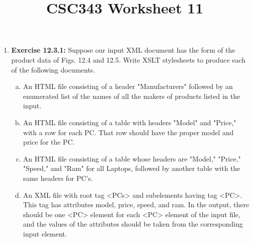 \documentclass[12pt]{article}
\begin{document}
\title{CSC343 Worksheet 11}
\maketitle

\begin{enumerate}[1.]
    \item \textbf{Exercise 12.3.1:} Suppose our input XML document has the form
    of the product data of Figs. 12.4 and 12.5. Write XSLT stylesheets to produce
    each of the following documents.

    \begin{enumerate}[a)]
        \item An HTML file consisting of a header "Manufacturers" followed by an enumerated list of the names of all the makers of products listed in the input.
        \item An HTML file consisting of a table with headers "Model" and "Price," with a row for each PC. That row should have the proper model and price for the PC.
        \item An HTML file consisting of a table whose headers are "Model," "Price," "Speed," and "Ram" for all Laptops, followed by another table with the same headers for PC's.
        \item An XML file with root tag <PCs> and subelements having tag <PC>. This tag has attributes model, price, speed, and ram. In the output, there should be one <PC> element for each <PC> element of the input file, and the values of the attributes should be taken from the corresponding input element.
    \end{enumerate}
\end{enumerate}
\end{document}
